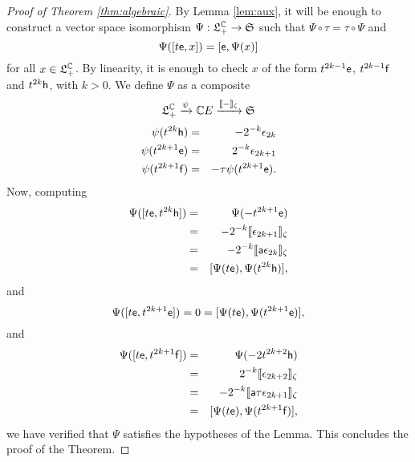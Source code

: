 \begin{proof}[Proof of Theorem \ref{thm:algebraic}]
        By Lemma \ref{lem:aux}, it will be enough to construct a vector space
        isomorphism $\Psi : \mathfrak{L}_+^{{\mathbb{C}}}\to \mathfrak{S}$ such that $\Psi\circ\tau=\tau\circ\Psi$ and
\[
    \Psi([t\mathsf{e},x]) = [\mathsf{e}, \Psi(x)]
\]
for all $x \in \mathfrak{L}_+^{{\mathbb{C}}}$. By linearity, it is enough to check $x$ of the form
$t^{2k-1}\mathsf{e}$, $t^{2k-1}\mathsf{f}$ and $t^{2k}\mathsf{h}$, with $k>0$. We define $\Psi$ as a composite 
\[
        \mathfrak{L}_+^{{\mathbb{C}}} \xrightarrow{\psi} {{\mathbb{C}}{}E} \xrightarrow{\llbracket{-}\rrbracket_\zeta} \mathfrak{S}
\]
\begin{eqnarray*}
        \psi(t^{2k}   \mathsf{h}) &=& -2^{-k} \epsilon_{2k}\\
        \psi(t^{2k+1} \mathsf{e}) &=&  2^{-k} \epsilon_{2k+1}\\
        \psi(t^{2k+1} \mathsf{f}) &=& -\tau \psi(t^{2k+1} \mathsf{e}).
\end{eqnarray*}
Now, computing
\begin{eqnarray*}
        \Psi([t\mathsf{e}, t^{2k} \mathsf{h}]) &=& \Psi(-t^{2k+1}\mathsf{e}) \\
                               &=& -2^{-k} \llbracket{\epsilon_{2k+1}}\rrbracket_\zeta \\
                               &=& -2^{-k} \llbracket{\mathsf{a}\epsilon_{2k}}\rrbracket_\zeta \\
                               &=& [\Psi(t\mathsf{e}), \Psi(t^{2k}\mathsf{h})],
\end{eqnarray*}
and
\[ \Psi([t\mathsf{e}, t^{2k+1} \mathsf{e}]) = 0 = [\Psi(t\mathsf{e}), \Psi(t^{2k+1}\mathsf{e})],  \]
and
\begin{eqnarray*} 
        \Psi([t\mathsf{e}, t^{2k+1} \mathsf{f}]) &=& \Psi(-2t^{2k+2}\mathsf{h}) \\
                                 &=& 2^{-k} \llbracket{\epsilon_{2k+2}}\rrbracket_\zeta \\
                                 &=& -2^{-k}\llbracket{\mathsf{a}\tau\epsilon_{2k+1}}\rrbracket_\zeta \\
                                 &=& [\Psi(t\mathsf{e}), \Psi(t^{2k+1}\mathsf{f})],
\end{eqnarray*}
we have verified that $\Psi$ satisfies the hypotheses of the Lemma. This
concludes the proof of the Theorem. 
\end{proof}
\endinput
